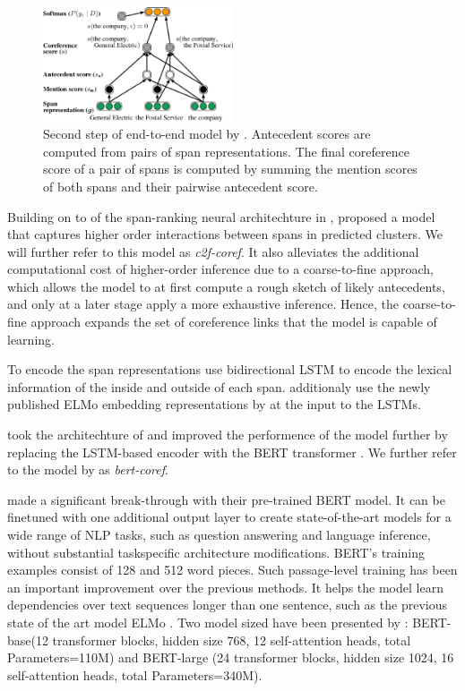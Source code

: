 \documentclass[11pt]{article}
\begin{document}
\begin{figure} %
    \centering
      \includegraphics[width=0.5\textwidth]{e2e_extra_info.eps}
  \caption{Second step of end-to-end model by \textcite{lee2017end}. Antecedent scores are computed from pairs of span representations. The final coreference score of a pair of spans is computed by summing the mention scores of both spans and their pairwise antecedent score.  }
  \label{fig:e2e_extra_info}
\end{figure}

Building on to of the span-ranking neural architechture in \textcite{lee2017end}, \textcite{lee2018higher} proposed a model that captures higher order interactions
between spans in predicted clusters. We will further refer to this model as \textit{c2f-coref}. It also alleviates the additional computational cost of higher-order inference due to a coarse-to-fine approach, which allows the model to at first compute a rough sketch of likely antecedents, and only at a later stage apply a more exhaustive inference. Hence, the coarse-to-fine approach expands the set of coreference links that the model is capable of learning. 

To encode the span representations \textcite{lee2017end} use bidirectional LSTM \parencite{lstm} to encode the lexical information of the inside and
outside of each span. \textcite{lee2018higher} additionaly use the newly published ELMo embedding representations by \textcite{peters2018elmo} at the input to the LSTMs.

\textcite{joshi2019coref} took the architechture of \textcite{lee2018higher} and improved the performence of the model further by replacing the LSTM-based encoder with the BERT transformer \textcite{devlin2019bert}. We further refer to the model by \textcite{joshi2019coref} as \textit{bert-coref}.

\textcite{devlin2019bert} made a significant break-through with their pre-trained BERT model. It can be finetuned with one additional output layer
to create state-of-the-art models for a wide
range of NLP tasks, such as question answering and language inference, without substantial taskspecific architecture modifications. BERT's training examples consist of 128 and 512 word pieces. Such passage-level training has been an important improvement over the previous methods. It helps the model learn dependencies over text sequences longer than one sentence, such as the previous state of the art model ELMo \parencite{peters2018elmo}. Two model sized have been presented by \textcite{devlin2019bert}:
BERT-base(12 transformer blocks, hidden size 768, 12 self-attention heads, total Parameters=110M) and BERT-large (24 transformer blocks, hidden size 1024, 16 self-attention heads, total Parameters=340M).
\end{document}
